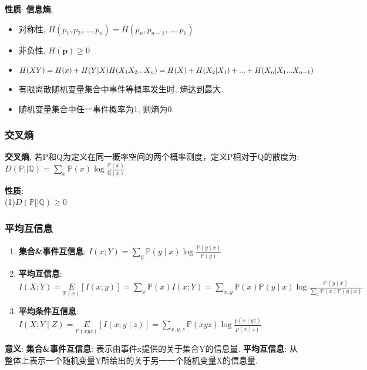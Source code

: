 \documentclass{article}
\newcommand{\env}[2]{\begin{#1}#2\end{#1}}
\begin{document}
            \textbf{性质}: \textbf{信息熵}, 
            \env{itemize}{
                \item 对称性, $H(p_1, p_2, ..., p_n) = H(p_n, p_{n-1}, ..., p_1)$
                \item 非负性, $H(\boldsymbol p) \ge 0$
                \item $H(XY) = H(x) + H(Y|X) \\ H(X_1 X_2 ... X_n) = H(X) + H(X_2|X_1) + ... + H(X_n|X_1...X_{n-1})$
                \item 有限离散随机变量集合中事件等概率发生时, 熵达到最大.
                \item 随机变量集合中任一事件概率为1, 则熵为0.
            }
            
        \subsubsection{交叉熵}
            \textbf{交叉熵}, 若P和Q为定义在同一概率空间的两个概率测度，定义P相对于Q的散度为: $D(\mathbb P || \mathbb Q)=\sum\limits_x \mathbb P(x) \log \frac{\mathbb P(x)}{\mathbb Q(x)}$
            
            \textbf{性质}:\\
                (1)$D(\mathbb P || \mathbb Q) \ge 0$

        \subsubsection{平均互信息}
            \env{enumerate}{
                \item \textbf{集合&事件互信息}: $I(x ; Y)=\sum\limits_{y} \mathbb P(y \mid x) \log \frac{\mathbb P(y \mid x)}{\mathbb P(y)}$
                \item \textbf{平均互信息}: $I(X ; Y) = \underset{\mathbb P(x)}{E}[I(x ; y)] = \sum\limits_{x} \mathbb P(x) I(x ; Y)=\sum\limits_{x, y} \mathbb P(x) \mathbb P(y \mid x) \log \frac{\mathbb P(y \mid x)}{\sum\limits_{x} \mathbb P(x) \mathbb P(y \mid x)}$
                \item \textbf{平均条件互信息}: $I(X ; Y \mid Z)=\underset{\mathbb P(x y z)}{E}[I(x ; y \mid z)]=\sum\limits_{x, y, z} \mathbb P(x y z) \log \frac{p(x \mid y z)}{p(x \mid z)}$
            }
            
            \textbf{意义}: \textbf{集合&事件互信息}: 表示由事件x提供的关于集合Y的信息量. \textbf{平均互信息}: 从整体上表示一个随机变量Y所给出的关于另一一个随机变量X的信息量.
            
\end{document}
